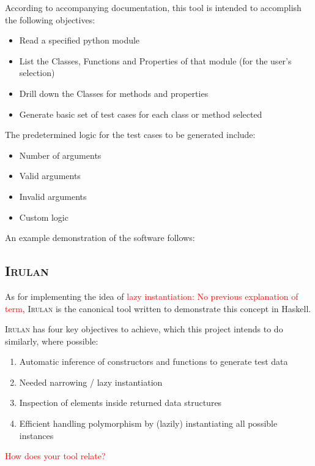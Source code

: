 \documentclass{icldt}
\numberwithin{equation}{section}       %
\begin{document}
According to accompanying documentation, this tool is intended to accomplish the following objectives:
\begin{itemize}
	\item Read a specified python module
	\item List the Classes, Functions and Properties of that module (for the user's selection)
	\item Drill down the Classes for methods and properties
	\item Generate basic set of test cases for each class or method selected
\end{itemize}

The predetermined logic for the test cases to be generated include:
\begin{itemize}
	\item Number of arguments
	\item Valid arguments
	\item Invalid arguments
	\item Custom logic
\end{itemize}

An example demonstration of the software follows:







\subsection{\textsc{Irulan}}
As for implementing the idea of \textcolor{red}{lazy instantiation: No previous explanation of term}, \textsc{Irulan} \cite{Allwood2011} is the canonical tool written to demonstrate this concept in Haskell.

\textsc{Irulan} has four key objectives to achieve, which this project intends to do similarly, where possible:
\begin{enumerate}[1.]
	\item Automatic inference of constructors and functions to generate test data
	\item Needed narrowing / lazy instantiation
	\item Inspection of elements inside returned data structures
	\item Efficient handling polymorphism by (lazily) instantiating all possible instances
\end{enumerate}
\textcolor{red}{How does your tool relate?}
\end{document}
